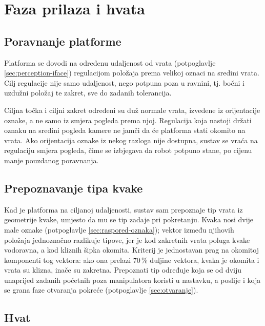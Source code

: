 \section{Faza prilaza i hvata}
\label{sec:prilaz}

\subsection{Poravnanje platforme}
\label{sec:poravnanje}

Platforma se dovodi na određenu udaljenost od vrata (potpoglavlje \ref{sec:perception-iface})
regulacijom položaja prema velikoj oznaci na sredini vrata. Cilj regulacije nije samo
udaljenost, nego potpuna poza u ravnini, tj. bočni i uzdužni položaj te zakret, sve do zadanih
tolerancija.

Ciljna točka i ciljni zakret određeni su duž normale vrata, izvedene iz orijentacije
oznake, a ne samo iz smjera pogleda prema njoj. Regulacija koja nastoji držati oznaku na
sredini pogleda kamere ne jamči da će platforma stati okomito na vrata. Ako orijentacija
oznake iz nekog razloga nije dostupna, sustav se vraća na regulaciju smjera pogleda, čime
se izbjegava da robot potpuno stane, po cijenu manje pouzdanog poravnanja.

\subsection{Prepoznavanje tipa kvake}
\label{sec:tip-kvake}

Kad je platforma na ciljanoj udaljenosti, sustav sam prepoznaje tip vrata iz geometrije kvake,
umjesto da mu se tip zadaje pri pokretanju. Kvaka nosi dvije male oznake (potpoglavlje
\ref{sec:raspored-oznaka}); vektor između njihovih položaja jednoznačno razlikuje tipove, jer je
kod zakretnih vrata poluga kvake vodoravna, a kod kliznih šipka okomita. Kriterij je jednostavan
prag na okomitoj komponenti tog vektora: ako ona prelazi 70\,\% duljine vektora, kvaka je
okomita i vrata su klizna, inače su zakretna. Prepoznati tip određuje koja se od dviju unaprijed
zadanih početnih poza manipulatora koristi u nastavku, a poslije i koja se grana faze otvaranja
pokreće (potpoglavlje \ref{sec:otvaranje}).

\subsection{Hvat}
\label{sec:hvat-postupak}

